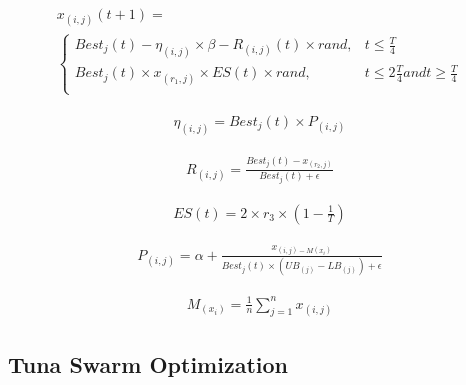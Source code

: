 \documentclass{elsarticle}
\begin{document}
\begin{equation}
\begin{gathered}
x_{(i,j)}(t+1)=\\
\begin{cases}
Best_j (t) - \eta_{(i,j)} \times \beta - R_{(i,j)}(t) \times rand, & t \leq \frac{T}{4} \\
Best_j (t) \times x_{(r_1,j)} \times ES(t) \times rand, & t \leq 2\frac{T}{4} and t \geq \frac{T}{4} \\
\end{cases}
\end{gathered}
\label{eq34}
\end{equation}   

\begin{equation}
\begin{gathered}
\eta_{(i,j)} = Best_j(t) \times P_{(i,j)}
\end{gathered}
\label{eq35}
\end{equation}

\begin{equation}
\begin{gathered}
R_{(i,j)} = \frac{Best_j(t) - x_{(r_2,j)}}{Best_j(t) + \epsilon}
\end{gathered}
\label{eq36}
\end{equation}

\begin{equation}
\begin{gathered}
ES(t) = 2 \times r_3 \times (1 - \frac{1}{T})
\end{gathered}
\label{eq37}
\end{equation}

\begin{equation}
\begin{gathered}
P_{(i,j)} = \alpha + \frac{x_{(i,j) - M(x_i)}}{Best_j(t) \times (UB_{(j)}-LB_{(j)}) + \epsilon} 
\end{gathered}
\label{eq38}
\end{equation}

\begin{equation}
\begin{gathered}
M_{(x_i)} = \frac{1}{n} \sum_{j=1}^{n} x_{(i,j)}
\end{gathered}
\label{eq39}
\end{equation}
\subsection{Tuna Swarm Optimization}
\end{document}
